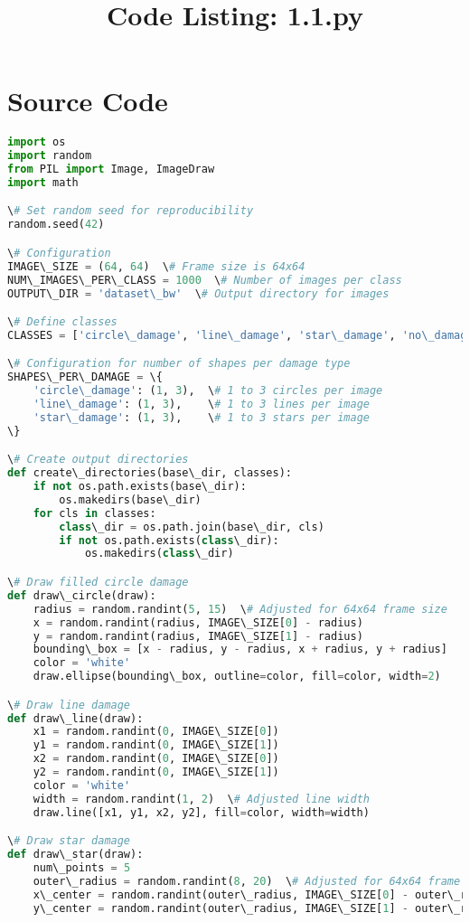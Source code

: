 \documentclass{article}
\title{Code Listing: 1.1.py}
\author{}
\date{}
\begin{document}
\maketitle

\section*{Source Code}

\begin{lstlisting}[language=Python]
import os
import random
from PIL import Image, ImageDraw
import math

\# Set random seed for reproducibility
random.seed(42)

\# Configuration
IMAGE\_SIZE = (64, 64)  \# Frame size is 64x64
NUM\_IMAGES\_PER\_CLASS = 1000  \# Number of images per class
OUTPUT\_DIR = 'dataset\_bw'  \# Output directory for images

\# Define classes
CLASSES = ['circle\_damage', 'line\_damage', 'star\_damage', 'no\_damage', 'multiple\_damages']

\# Configuration for number of shapes per damage type
SHAPES\_PER\_DAMAGE = \{
    'circle\_damage': (1, 3),  \# 1 to 3 circles per image
    'line\_damage': (1, 3),    \# 1 to 3 lines per image
    'star\_damage': (1, 3),    \# 1 to 3 stars per image
\}

\# Create output directories
def create\_directories(base\_dir, classes):
    if not os.path.exists(base\_dir):
        os.makedirs(base\_dir)
    for cls in classes:
        class\_dir = os.path.join(base\_dir, cls)
        if not os.path.exists(class\_dir):
            os.makedirs(class\_dir)

\# Draw filled circle damage
def draw\_circle(draw):
    radius = random.randint(5, 15)  \# Adjusted for 64x64 frame size
    x = random.randint(radius, IMAGE\_SIZE[0] - radius)
    y = random.randint(radius, IMAGE\_SIZE[1] - radius)
    bounding\_box = [x - radius, y - radius, x + radius, y + radius]
    color = 'white'
    draw.ellipse(bounding\_box, outline=color, fill=color, width=2)

\# Draw line damage
def draw\_line(draw):
    x1 = random.randint(0, IMAGE\_SIZE[0])
    y1 = random.randint(0, IMAGE\_SIZE[1])
    x2 = random.randint(0, IMAGE\_SIZE[0])
    y2 = random.randint(0, IMAGE\_SIZE[1])
    color = 'white'
    width = random.randint(1, 2)  \# Adjusted line width
    draw.line([x1, y1, x2, y2], fill=color, width=width)

\# Draw star damage
def draw\_star(draw):
    num\_points = 5
    outer\_radius = random.randint(8, 20)  \# Adjusted for 64x64 frame size
    x\_center = random.randint(outer\_radius, IMAGE\_SIZE[0] - outer\_radius)
    y\_center = random.randint(outer\_radius, IMAGE\_SIZE[1] - outer\_radius)
    

\end{lstlisting}
\end{document}
